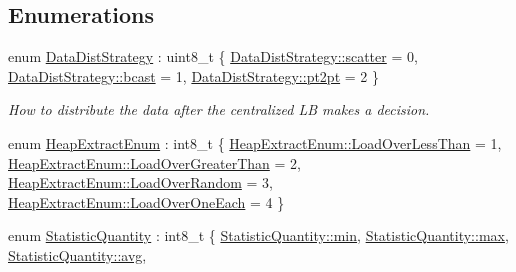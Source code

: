\subsection*{Enumerations}
\begin{DoxyCompactItemize}
\item 
enum \hyperlink{namespacevt_1_1vrt_1_1collection_1_1lb_a0c49bf89a59ba0fd5160bc3894417dfa}{Data\+Dist\+Strategy} \+: uint8\+\_\+t \{ \hyperlink{namespacevt_1_1vrt_1_1collection_1_1lb_a0c49bf89a59ba0fd5160bc3894417dfaa50894a237d9bcde0a18769af9a768baf}{Data\+Dist\+Strategy\+::scatter} = 0, 
\hyperlink{namespacevt_1_1vrt_1_1collection_1_1lb_a0c49bf89a59ba0fd5160bc3894417dfaa98e9f4944cd44d2d5ad506249b8483cd}{Data\+Dist\+Strategy\+::bcast} = 1, 
\hyperlink{namespacevt_1_1vrt_1_1collection_1_1lb_a0c49bf89a59ba0fd5160bc3894417dfaa01a4aa94928c33396b2a8c4cbfd6483e}{Data\+Dist\+Strategy\+::pt2pt} = 2
 \}\begin{DoxyCompactList}\small\item\em How to distribute the data after the centralized LB makes a decision. \end{DoxyCompactList}
\item 
enum \hyperlink{namespacevt_1_1vrt_1_1collection_1_1lb_aeb0f47cf4b89bed7ea05462d0c2e5b5e}{Heap\+Extract\+Enum} \+: int8\+\_\+t \{ \hyperlink{namespacevt_1_1vrt_1_1collection_1_1lb_aeb0f47cf4b89bed7ea05462d0c2e5b5ea41a33133c182e43b9dfc2599f39eaa94}{Heap\+Extract\+Enum\+::\+Load\+Over\+Less\+Than} = 1, 
\hyperlink{namespacevt_1_1vrt_1_1collection_1_1lb_aeb0f47cf4b89bed7ea05462d0c2e5b5ea3d8879d16ae598961ef15af199863c40}{Heap\+Extract\+Enum\+::\+Load\+Over\+Greater\+Than} = 2, 
\hyperlink{namespacevt_1_1vrt_1_1collection_1_1lb_aeb0f47cf4b89bed7ea05462d0c2e5b5eabde3377fc5ba5b092a195c8ac4b6ea09}{Heap\+Extract\+Enum\+::\+Load\+Over\+Random} = 3, 
\hyperlink{namespacevt_1_1vrt_1_1collection_1_1lb_aeb0f47cf4b89bed7ea05462d0c2e5b5eaa3040fb94a8691e32930a5836d830ec4}{Heap\+Extract\+Enum\+::\+Load\+Over\+One\+Each} = 4
 \}
\item 
enum \hyperlink{namespacevt_1_1vrt_1_1collection_1_1lb_a74989c7b4dd16fcc067e90a29cd1febe}{Statistic\+Quantity} \+: int8\+\_\+t \{ \newline
\hyperlink{namespacevt_1_1vrt_1_1collection_1_1lb_a74989c7b4dd16fcc067e90a29cd1febead8bd79cc131920d5de426f914d17405a}{Statistic\+Quantity\+::min}, 
\hyperlink{namespacevt_1_1vrt_1_1collection_1_1lb_a74989c7b4dd16fcc067e90a29cd1febea2ffe4e77325d9a7152f7086ea7aa5114}{Statistic\+Quantity\+::max}, 
\hyperlink{namespacevt_1_1vrt_1_1collection_1_1lb_a74989c7b4dd16fcc067e90a29cd1febeae322d423f075b0ab2daad27011d24909}{Statistic\+Quantity\+::avg}, 

\end{DoxyCompactItemize}
